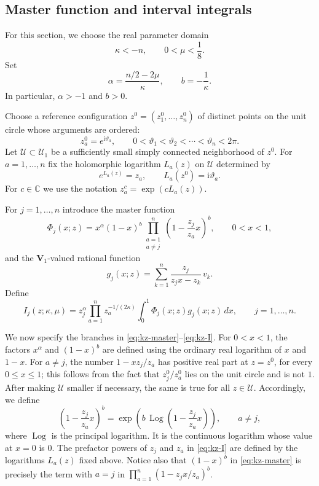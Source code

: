 \documentclass[12pt]{amsart}
\theoremstyle{definition}
\numberwithin{equation}{section}
\theoremstyle{definition}
\let\mc\mathcal
\let\ka\kappa
\let\le\leqslant
\def\C{{\mathbb C}}
\def\beq{\begin{equation}}
\def\eeq{\end{equation}}
\begin{document}
\subsection{Master function and interval integrals}
\label{subsec:kz-master-integrals}

For this section, we choose the real parameter domain
\beq\label{eq:kz-chamber}
 \ka<-n,\qquad 0<\mu<\frac18.
\eeq
Set
\beq\label{eq:kz-exponents}
 \alpha=\frac{n/2-2\mu}{\ka},\qquad b=-\frac1\ka.
\eeq
In particular, $\alpha>-1$ and $b>0$.

Choose a reference configuration $z^0=(z_1^0,\ldots,z_n^0)$
of distinct points on the unit circle whose arguments are ordered:
\beq\label{eq:kz-angle-order}
 z_a^0=e^{\mathrm{i}\vartheta_a},\qquad
 0<\vartheta_1<\vartheta_2<\cdots<\vartheta_n<2\pi.
\eeq
Let $\mc U\subset\mc U_1$ be a sufficiently small simply
connected neighborhood of $z^0$.
For $a=1,\ldots,n$ fix the holomorphic logarithm
$L_a(z)$ on $\mc U$ determined by
\[
 e^{L_a(z)}=z_a,\qquad L_a(z^0)=\mathrm{i}\vartheta_a.
\]
For $c\in\C$ we use the notation
$z_a^c=\exp(cL_a(z))$.

For $j=1,\ldots,n$ introduce the master function
\beq\label{eq:kz-master}
 \Phi_j(x;z)=x^\alpha(1-x)^b
 \prod_{\substack{a=1\\a\ne j}}^n
 \left(1-\frac{z_j}{z_a}x\right)^b,
 \qquad 0<x<1,
\eeq
and the $\mathbf V_1$-valued rational function
\beq\label{eq:kz-vector}
 g_j(x;z)=\sum_{k=1}^n\frac{z_j}{z_jx-z_k}\,v_k.
\eeq
Define
\beq\label{eq:kz-I}
 \boxed{\quad
 I_j(z;\ka,\mu)=
 z_j^\alpha\prod_{a=1}^n z_a^{-1/(2\ka)}
 \int_0^1\Phi_j(x;z)g_j(x;z)\,dx,
 \qquad j=1,\ldots,n.
 \quad}
\eeq

We now specify the branches in \eqref{eq:kz-master}--\eqref{eq:kz-I}.
For $0<x<1$, the factors $x^\alpha$ and $(1-x)^b$
are defined using the ordinary real logarithm of $x$ and $1-x$.
For $a\ne j$, the number $1-xz_j/z_a$ has positive real part
at $z=z^0$, for every $0\le x\le1$; this follows from the
fact that $z_j^0/z_a^0$ lies on the unit circle and is not $1$.
After making $\mc U$ smaller if necessary, the same is true
for all $z\in\mc U$.  Accordingly, we define
\[
 \left(1-\frac{z_j}{z_a}x\right)^b
 =\exp\left(b\,\operatorname{Log}
       \left(1-\frac{z_j}{z_a}x\right)\right),
 \qquad a\ne j,
\]
where $\operatorname{Log}$ is the principal logarithm.
It is the continuous logarithm whose value at $x=0$ is $0$.
The prefactor powers of $z_j$ and $z_a$ in \eqref{eq:kz-I}
are defined by the logarithms $L_a(z)$ fixed above.
Notice also that $(1-x)^b$ in \eqref{eq:kz-master}
is precisely the term with $a=j$ in
$\prod_{a=1}^n(1-z_jx/z_a)^b$.
\end{document}
